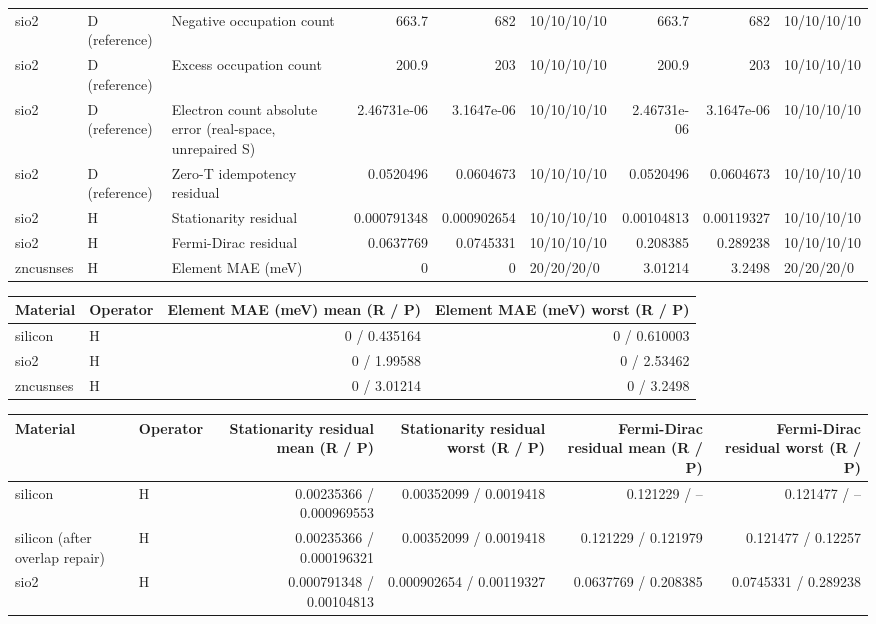 \begin{tabular}{lllrrlrrl}
sio2 & D (reference) & Negative occupation count & 663.7 & 682 & 10/10/10/10 & 663.7 & 682 & 10/10/10/10 \\
sio2 & D (reference) & Excess occupation count & 200.9 & 203 & 10/10/10/10 & 200.9 & 203 & 10/10/10/10 \\
sio2 & D (reference) & Electron count absolute error (real-space, unrepaired S) & 2.46731e-06 & 3.1647e-06 & 10/10/10/10 & 2.46731e-06 & 3.1647e-06 & 10/10/10/10 \\
sio2 & D (reference) & Zero-T idempotency residual & 0.0520496 & 0.0604673 & 10/10/10/10 & 0.0520496 & 0.0604673 & 10/10/10/10 \\
sio2 & H & Stationarity residual & 0.000791348 & 0.000902654 & 10/10/10/10 & 0.00104813 & 0.00119327 & 10/10/10/10 \\
sio2 & H & Fermi-Dirac residual & 0.0637769 & 0.0745331 & 10/10/10/10 & 0.208385 & 0.289238 & 10/10/10/10 \\
zncusnses & H & Element MAE (meV) & 0 & 0 & 20/20/20/0 & 3.01214 & 3.2498 & 20/20/20/0 \\
\bottomrule
\end{tabular}
\begin{tabular}{llrr}
\toprule
Material & Operator & Element MAE (meV) mean (R / P) & Element MAE (meV) worst (R / P) \\
\midrule
silicon & H & 0 / 0.435164 & 0 / 0.610003 \\
sio2 & H & 0 / 1.99588 & 0 / 2.53462 \\
zncusnses & H & 0 / 3.01214 & 0 / 3.2498 \\
\bottomrule
\end{tabular}
\begin{tabular}{llrrrr}
\toprule
Material & Operator & Stationarity residual mean (R / P) & Stationarity residual worst (R / P) & Fermi-Dirac residual mean (R / P) & Fermi-Dirac residual worst (R / P) \\
\midrule
silicon & H & 0.00235366 / 0.000969553 & 0.00352099 / 0.0019418 & 0.121229 / -- & 0.121477 / -- \\
silicon (after overlap repair) & H & 0.00235366 / 0.000196321 & 0.00352099 / 0.0019418 & 0.121229 / 0.121979 & 0.121477 / 0.12257 \\
sio2 & H & 0.000791348 / 0.00104813 & 0.000902654 / 0.00119327 & 0.0637769 / 0.208385 & 0.0745331 / 0.289238 \\
\bottomrule
\end{tabular}

